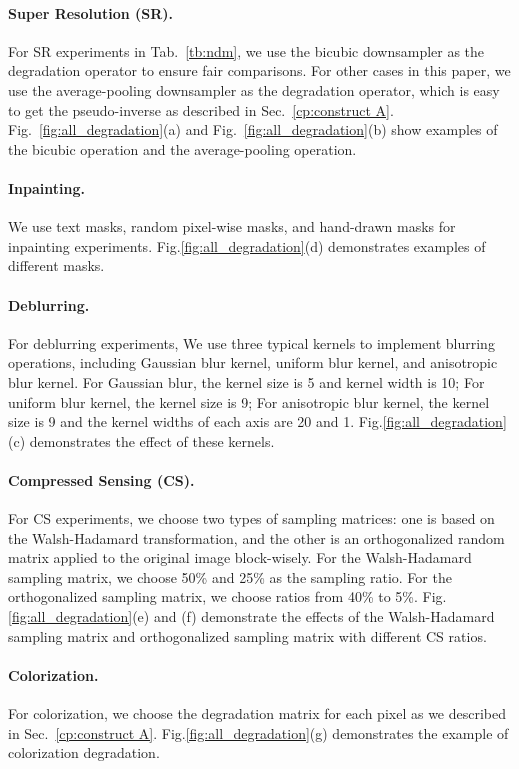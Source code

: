 \documentclass{article} \usepackage{iclr2023_conference,times}
\begin{document}
\paragraph{Super Resolution (SR).} For SR experiments in Tab.~\ref{tb:ndm}, we use the bicubic downsampler as the degradation operator to ensure fair comparisons. For other cases in this paper, we use the average-pooling downsampler as the degradation operator, which is easy to get the pseudo-inverse as described in Sec.~\ref{cp:construct A}. Fig.~\ref{fig:all_degradation}(a) and Fig.~\ref{fig:all_degradation}(b) show examples of the bicubic operation and the average-pooling operation.

\paragraph{Inpainting.} We use text masks, random pixel-wise masks, and hand-drawn masks for inpainting experiments. Fig.\ref{fig:all_degradation}(d) demonstrates examples of different masks.

\paragraph{Deblurring.} For deblurring experiments, We use three typical kernels to implement blurring operations, including Gaussian blur kernel, uniform blur kernel, and anisotropic blur kernel. For Gaussian blur, the kernel size is 5 and kernel width is 10; For uniform blur kernel, the kernel size is 9; For anisotropic blur kernel, the kernel size is 9 and the kernel widths of each axis are 20 and 1. Fig.\ref{fig:all_degradation}(c) demonstrates the effect of these kernels.

\paragraph{Compressed Sensing (CS).} For CS experiments, we choose two types of sampling matrices: one is based on the Walsh-Hadamard transformation, and the other is an orthogonalized random matrix applied to the original image block-wisely. For the Walsh-Hadamard sampling matrix, we choose 50\% and 25\% as the sampling ratio. For the orthogonalized sampling matrix, we choose ratios from 40\% to 5\%. Fig.\ref{fig:all_degradation}(e) and (f) demonstrate the effects of the Walsh-Hadamard sampling matrix and orthogonalized sampling matrix with different CS ratios.

\paragraph{Colorization.} For colorization, we choose the degradation matrix  for each pixel as we described in Sec.~\ref{cp:construct A}. Fig.\ref{fig:all_degradation}(g) demonstrates the example of colorization degradation.
\end{document}
